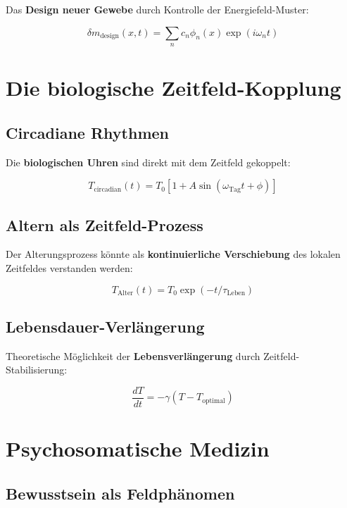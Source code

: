 \documentclass[12pt,a4paper]{report}
\begin{document}
	Das \textbf{Design neuer Gewebe} durch Kontrolle der Energiefeld-Muster:
	
	\begin{equation}
		\delta m_{\text{design}}(x,t) = \sum_n c_n \phi_n(x) \exp(i\omega_n t)
	\end{equation}
	
	\section{Die biologische Zeitfeld-Kopplung}
	
	\subsection{Circadiane Rhythmen}
	
	Die \textbf{biologischen Uhren} sind direkt mit dem Zeitfeld gekoppelt:
	
	\begin{equation}
		T_{\text{circadian}}(t) = T_0[1 + A\sin(\omega_{\text{Tag}}t + \phi)]
	\end{equation}
	
	\subsection{Altern als Zeitfeld-Prozess}
	
	Der Alterungsprozess könnte als \textbf{kontinuierliche Verschiebung} des lokalen Zeitfeldes verstanden werden:
	
	\begin{equation}
		T_{\text{Alter}}(t) = T_0 \exp(-t/\tau_{\text{Leben}})
	\end{equation}
	
	\subsection{Lebensdauer-Verlängerung}
	
	Theoretische Möglichkeit der \textbf{Lebensverlängerung} durch Zeitfeld-Stabilisierung:
	
	\begin{equation}
		\frac{dT}{dt} = -\gamma(T - T_{\text{optimal}})
	\end{equation}
	
	\section{Psychosomatische Medizin}
	
	\subsection{Bewusstsein als Feldphänomen}
	
\end{document}
